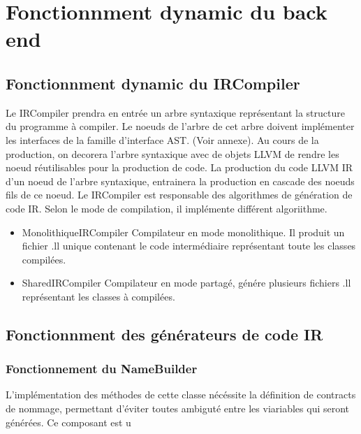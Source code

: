 \documentclass{report}
\begin{document}
\section{Fonctionnment dynamic du back end}

\subsection{Fonctionnment dynamic du IRCompiler}

Le IRCompiler prendra en entrée un arbre syntaxique représentant la structure du programme à compiler.
Le noeuds de l'arbre de cet arbre doivent implémenter les interfaces de la famille d'interface AST. (Voir annexe).
Au cours de la production, on decorera l'arbre syntaxique avec de objets LLVM de rendre les noeud réutilisables
pour la production de code. La production du code LLVM IR d'un noeud de l'arbre syntaxique, entrainera la production en cascade des noeuds fils de ce noeud. Le IRCompiler est responsable des algorithmes de génération de code IR. Selon le mode de compilation,
il implémente différent algoriithme. \\
 \begin{itemize}
	\item MonolithiqueIRCompiler Compilateur en mode monolithique. Il produit un fichier .ll unique contenant le code intermédiaire 
	représentant toute les classes compilées. 
	\item SharedIRCompiler Compilateur en mode partagé, génére plusieurs fichiers .ll représentant les classes à compilées.
	\end{itemize}

\subsection{Fonctionnment des générateurs de code IR}

   \subsubsection{Fonctionnement du NameBuilder }
   L'implémentation des méthodes de cette classe nécéssite la définition de contracts de nommage, permettant
   d'éviter toutes ambiguté entre les viariables qui seront générées. Ce composant est u
\end{document}
